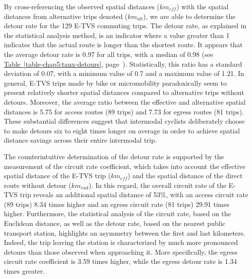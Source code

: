\begin{refsegment}
By cross-referencing the observed spatial distances (\(km_{eff}\)) with the spatial distances from alternative trips denoted (\(km_{alt}\)), we are able to determine the detour rate for the 129 \acrshort{E-TVS} commuting trips. The detour rate, as explained in the statistical analysis method, is an indicator where a value greater than 1 indicates that the actual route is longer than the shortest route. It appears that the average detour rate is 0.97 for all trips, with a median of 0.98 (see \hyperref[table-chap5:taux-detours]{Table~\ref{table-chap5:taux-detours}}, page~\pageref{table-chap5:taux-detours}). Statistically, this ratio has a standard deviation of 0.07, with a minimum value of 0.7 and a maximum value of 1.21. In general, \acrshort{E-TVS} trips made by bike or micromobility paradoxically seem to present relatively shorter spatial distances compared to alternative trips without detours. Moreover, the average ratio between the effective and alternative spatial distances is 5.75 for access routes (89 trips) and 7.73 for egress routes (81 trips). These substantial differences suggest that intermodal cyclists deliberately choose to make detours six to eight times longer on average in order to achieve spatial distance savings across their entire intermodal trip.%


The counterintuitive determination of the detour rate is supported by the measurement of the circuit rate coefficient, which takes into account the effective spatial distance of the \acrshort{E-TVS} trip (\(km_{eff}\)) and the spatial distance of the direct route without detour (\(km_{eud}\)). In this regard, the overall circuit rate of the \acrshort{E-TVS} trip reveals an additional spatial distance of 53\%, with an access circuit rate (89 trips) 8.34 times higher and an egress circuit rate (81 trips) 29.91 times higher. Furthermore, the statistical analysis of the circuit rate, based on the Euclidean distance, as well as the detour rate, based on the nearest public transport station, highlights an asymmetry between the first and last kilometers. Indeed, the trip leaving the station is characterized by much more pronounced detours than those observed when approaching it. More specifically, the egress circuit rate coefficient is 3.59 times higher, while the egress detour rate is 1.34 times greater.%


\end{refsegment}
